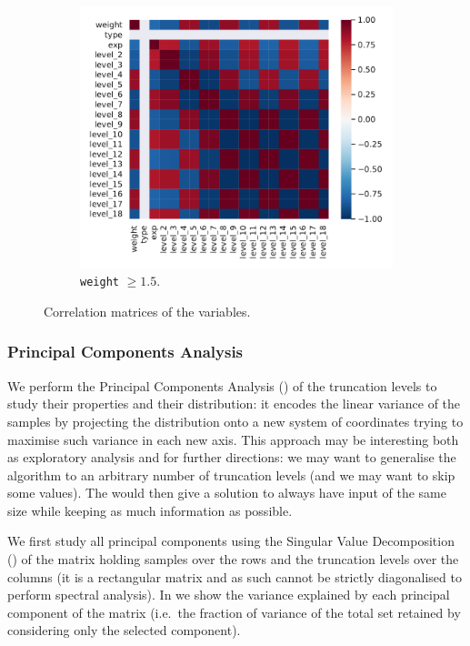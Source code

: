 \begin{figure}[htbp]
  \begin{subfigure}{0.32\textwidth}
    \centering
    \includegraphics[width=\linewidth]{img/corr_mat_high}
    \caption{\texttt{weight} $\ge 1.5$.}
  \end{subfigure}
  \caption{Correlation matrices of the variables.}
  \label{fig:lumps:corr}
\end{figure}


\subsubsection{Principal Components Analysis}

We perform the Principal Components Analysis (\pca) of the truncation levels to study their properties and their distribution: it encodes the linear variance of the samples by projecting the distribution onto a new system of coordinates trying to maximise such variance in each new axis.
This approach may be interesting both as exploratory analysis and for further directions: we may want to generalise the algorithm to an arbitrary number of truncation levels (and we may want to skip some values).
The \pca would then give a solution to always have input of the same size while keeping as much information as possible.

We first study all principal components using the Singular Value Decomposition (\svd) of the matrix holding samples over the rows and the truncation levels over the columns (it is a rectangular matrix and as such cannot be strictly diagonalised to perform spectral analysis).
In  we show the variance explained by each principal component of the matrix (i.e.\ the fraction of variance of the total set retained by considering only the selected component).

